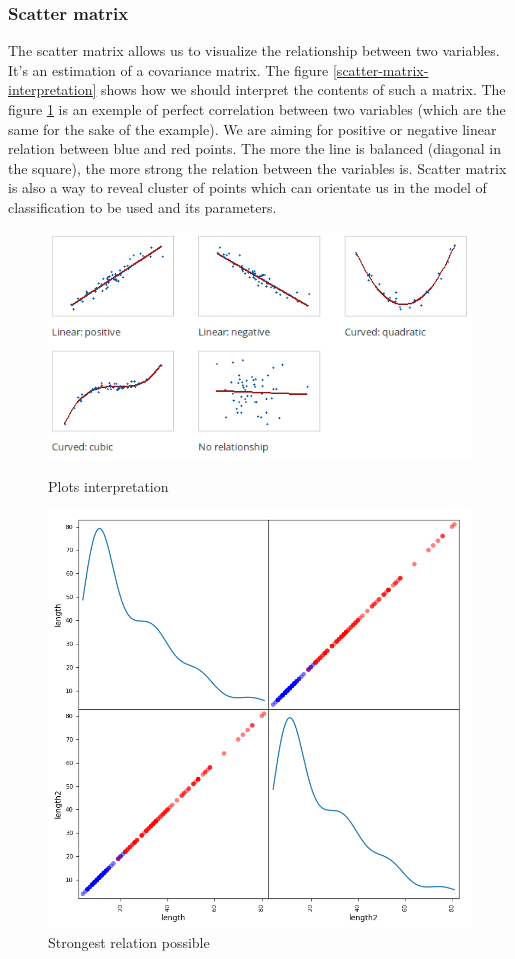 \documentclass[conference,11pt]{IEEEtran}
\begin{document}
\subsubsection{Scatter matrix}
The scatter matrix allows us to visualize the relationship between two
variables. It's an estimation of a covariance matrix. The figure
\ref{scatter-matrix-interpretation} shows how we should interpret the contents
of such a matrix. The figure \ref{scatter-matrix-right} is an exemple of perfect
correlation between two variables (which are the same for the sake of the
example). We are aiming for positive or negative linear relation between blue
and red points. The more the line is balanced (diagonal in the square), the more
strong the relation between the variables is. Scatter matrix is also a way to
reveal cluster of points which can orientate us in the model of classification
to be used and its parameters.

\begin{figure}[!t]
  \centering
  \includegraphics[width=\linewidth]{scatter_matrix_interpretation}
  \caption{Plots interpretation}
  \label{scatter-matrix-interpretation}
  \includegraphics[width=\linewidth]{scatter_matrix_lengths_correlation_right}
  \caption{Strongest relation possible}
  \label{scatter-matrix-right}
\end{figure}
\end{document}
